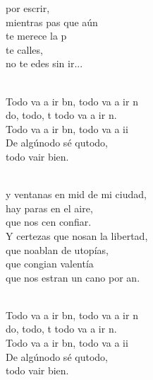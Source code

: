 \documentclass[12pt]{article}
\begin{document}
\begin{multicols*}{2}
\begin{cancion}
	por escrir,\\
	mientras pas que aún\\
	te merece la p\\
	 te calles, \\
	no te edes sin ir...\\\jump\\
	\begin{chorus}%
	Todo va a ir bn, todo va a ir n\\
	do, todo, t todo va a ir n.\\
	Todo va a ir bn, todo va a ii\\
	De algúnodo sé qutodo,\\
	todo vair bien.\\
	\end{chorus}%
	\jump\\
	y ventanas en mid de mi ciudad,\\
	hay paras en el aire,\\
	que nos cen confiar.\\
	Y certezas que nosan la libertad,\\
	que noablan de utopías,\\
	que congian valentía\\
	que nos estran un cano por an.\\\jump\\
	\begin{chorus}%
	Todo va a ir bn, todo va a ir n\\
	do, todo, t todo va a ir n.\\
	Todo va a ir bn, todo va a ii\\
	De algúnodo sé qutodo,\\
	todo vair bien.\\
	\end{chorus}%
	\jump\\
\end{cancion}%


\end{multicols*}
\end{document}
